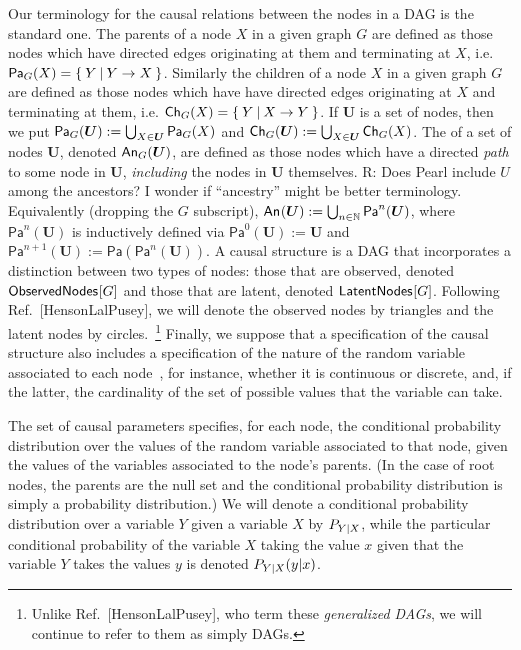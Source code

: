 Our terminology for the causal relations between the nodes in a DAG is the standard one. The parents of a node $X$ in a given graph $G$ are defined as those nodes which have directed edges originating at them and terminating at $X$, i.e. $\Pa[G]{X} = \{\:Y\:|\:Y\to X\:\}$.  Similarly the children of a node $X$ in a given graph $G$ are defined as those nodes which have have directed edges originating at $X$ and terminating at them, i.e. $\Ch[G]{X} = \{\:Y\:|\: X\to Y\:\}$. If $\bm{U}$ is a set of nodes, then we put $\Pa[G]{\bm{U}} := \bigcup_{X\in\bm{U}} \Pa[G]{X}$ and $\Ch[G]{\bm{U}} := \bigcup_{X\in\bm{U}} \Ch[G]{X}$.  The  of a set of nodes $\bm{U}$, denoted $\An[G]{\bm{U}}$, are defined as those nodes which have a directed \emph{path} to some node in $\bm{U}$, \emph{including} the nodes in $\bm{U}$ themselves. {\color{purple} R: Does Pearl include $U$ among the ancestors?  I wonder if ``ancestry'' might be better terminology.} Equivalently (dropping the $G$ subscript), $\An{\bm{U}} := \bigcup_{n\in\mathbb{N}} \mathsf{Pa}^n(\bm{U})$, where $\mathsf{Pa}^n(\bm{U})$ is inductively defined via $\mathsf{Pa}^0(\bm{U}) := \bm{U}$ and $\mathsf{Pa}^{n+1}(\bm{U}) := \mathsf{Pa}(\mathsf{Pa}^n(\bm{U}))$. A causal structure is a DAG that incorporates a distinction between two types of nodes: those that are observed, denoted $\SmallNamedFunction{ObservedNodes}{G}$ and those that are latent, denoted $\SmallNamedFunction{LatentNodes}{G}$.  %
Following Ref.~[HensonLalPusey], we will denote the observed nodes by triangles and the latent nodes by circles.~\footnote{Unlike Ref.~[HensonLalPusey], who term these {\em generalized DAGs}, we will continue to refer to them as simply DAGs. }  Finally, we suppose that a specification of the causal structure also includes a specification of the nature of the random variable associated to each node~\cite[Appendix A]{BeyondBellII}, for instance, whether it is continuous or discrete, and, if the latter, the cardinality of the set of possible values that the variable can take.


The set of causal parameters specifies, for each node, the conditional probability distribution over the values of the random variable associated to that node, given the values of the variables associated to the node's parents.  (In the case of root nodes, the parents are the null set and the conditional probability distribution is simply a probability distribution.)
We will denote a conditional probability distribution over a variable $Y$ given a variable $X$ by $\pfunc{Y|X}$, while the particular conditional probability of the variable $X$ taking the value $x$ given that the variable $Y$ takes the values $y$ is denoted $\pdf[Y|X]{y|x}$.  

